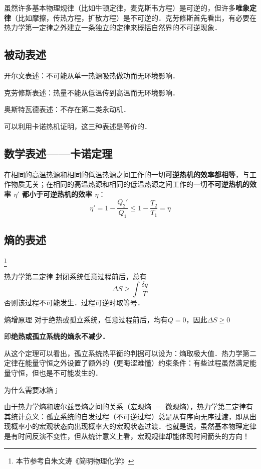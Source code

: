 
\begin{issues}
\issueDraft
\end{issues}


虽然许多基本物理规律（比如牛顿定律，麦克斯韦方程）是可逆的，但许多\textbf{唯象定律}（比如摩擦，传热方程，扩散方程）是不可逆的．克劳修斯首先看出，有必要在热力学第一定律之外建立一条独立的定律来概括自然界的不可逆现象．

\subsection{被动表述}
开尔文表述：不可能从单一热源吸热做功而无环境影响．

克劳修斯表述：热量不能从低温传到高温而无环境影响．

奥斯特瓦德表述：不存在第二类永动机．

可以利用卡诺热机证明，这三种表述是等价的．

\subsection{数学表述——卡诺定理}

在相同的高温热源和相同的低温热源之间工作的一切\textbf{可逆热机的效率都相等}，与工作物质无关；在相同的高温热源和相同的低温热源之间工作的一切\textbf{不可逆热机的效率 $\eta'$ 都小于可逆热机的效率 $\eta$}：
\begin{equation}
\eta'=1-\frac{Q_2'}{Q_1}\le 1-\frac{T_2}{T_1}=\eta
\end{equation}

\subsection{熵的表述}
\footnote{本节参考自朱文涛《简明物理化学》}

\begin{theorem}{热力学第二定律}
封闭系统任意过程前后，总有
\begin{equation}
\Delta S \ge \int \frac{\delta q}{T}
\end{equation}
否则该过程不可能发生．过程可逆时取等号．
\end{theorem}

\begin{corollary}{熵增原理}
对于绝热或孤立系统，任意过程前后，均有$Q=0$，因此$\Delta S \ge 0$

即\textbf{绝热或孤立系统的熵永不减少．}
\end{corollary}

从这个定理可以看出，孤立系统热平衡的判据可以设为：熵取极大值．热力学第二定律在能量守恒之外设置了额外的（更晦涩难懂）约束条件：有些过程虽然满足能量守恒，但也是不可能发生的．

\begin{example}{为什么需要冰箱}
j
\end{example}


由于热力学熵和玻尔兹曼熵之间的关系（宏观熵 $=$ 微观熵），热力学第二定律有其统计意义：孤立系统的自发过程（不可逆过程）总是从有序向无序过渡，即从出现概率小的宏观状态向出现概率大的宏观状态过渡．也就是说，虽然基本物理定律是有时间反演不变性，但从统计意义上看，宏观规律却能体现时间箭头的方向！
